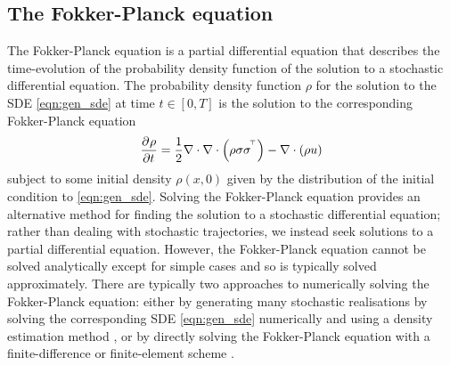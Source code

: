 \subsection{The Fokker-Planck equation}
The Fokker-Planck equation is a partial differential equation that describes the time-evolution of the probability density function of the solution to a stochastic differential equation.
The probability density function \(\rho\) for the solution to the SDE \cref{eqn:gen_sde} at time \(t \in [0,T]\) is the solution to the corresponding Fokker-Planck equation \citep{Risken_2012_FokkerPlanckEquationMethods}
\begin{equation}
	\dpd{\rho}{t} = \frac12\nabla\cdot\nabla\cdot\left(\rho\sigma\sigma^{\T}\right) - \nabla\cdot\left(\rho u\right)
	\label{eqn:fp_eqn}
\end{equation}
subject to some initial density \(\rho\!\left(x,0\right)\) given by the distribution of the initial condition to \cref{eqn:gen_sde}.
Solving the Fokker-Planck equation provides an alternative method for finding the solution to a stochastic differential equation; rather than dealing with stochastic trajectories, we instead seek solutions to a partial differential equation.
However, the Fokker-Planck equation cannot be solved analytically except for simple cases and so is typically solved approximately.
There are typically two approaches to numerically solving the Fokker-Planck equation: either by generating many stochastic realisations by solving the corresponding SDE \cref{eqn:gen_sde} numerically and using a density estimation method \citep{Silverman_2017_DensityEstimationStatisticsa}, or by directly solving the Fokker-Planck equation with a finite-difference or finite-element scheme \citep{PichlerEtAl_2013_NumericalSolutionFokker}.
